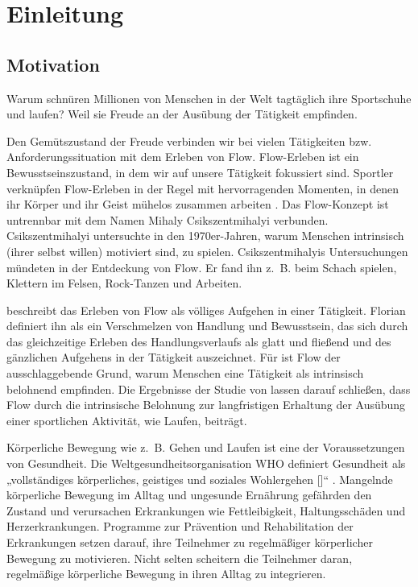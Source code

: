 \chapter{Einleitung} %
\label{cha:einleitung}

\section{Motivation} %
\label{sec:motivation}

Warum schnüren Millionen von Menschen in der Welt tagtäglich ihre Sportschuhe und laufen? Weil sie Freude an der Ausübung der Tätigkeit empfinden.

Den Gemütszustand der Freude verbinden wir bei vielen Tätigkeiten bzw. Anforderungssituation mit dem Erleben von Flow. Flow-Erleben ist ein Bewusstseinszustand, in dem wir auf unsere Tätigkeit fokussiert sind. Sportler verknüpfen Flow-Erleben in der Regel mit hervorragenden Momenten, in denen ihr Körper und ihr Geist mühelos zusammen arbeiten \citep[S.~5]{Jackson1999}. Das Flow-Konzept ist untrennbar mit dem Namen Mihaly Csikszentmihalyi verbunden. Csikszentmihalyi untersuchte in den 1970er-Jahren, warum Menschen intrinsisch (ihrer selbst willen) motiviert sind, zu spielen. Csikszentmihalyis Untersuchungen mündeten in der Entdeckung von Flow. Er fand ihn z.~B. beim Schach spielen, Klettern im Felsen, Rock-Tanzen und Arbeiten.

\citet[][S.~58~f.]{Csikszentmihalyi2010} beschreibt das Erleben von Flow als völliges Aufgehen in einer Tätigkeit. Florian \citet[][S.~13]{Henk2014} definiert ihn als ein Verschmelzen von Handlung und Bewusstsein, das sich durch das gleichzeitige Erleben des Handlungsverlaufs als glatt und fließend und des gänzlichen Aufgehens in der Tätigkeit auszeichnet. Für \citet[][S.~602]{Csikszentmihalyi2005} ist Flow der ausschlaggebende Grund, warum Menschen eine Tätigkeit als intrinsisch belohnend empfinden. Die Ergebnisse der Studie von \citet[][S.~174]{Schuler2009} lassen darauf schließen, dass Flow durch die intrinsische Belohnung zur langfristigen Erhaltung der Ausübung einer sportlichen Aktivität, wie Laufen, beiträgt.

Körperliche Bewegung wie z.~B. Gehen und Laufen ist eine der Voraussetzungen von Gesundheit. Die Weltgesundheitsorganisation \ac{WHO} definiert Gesundheit als „vollständiges körperliches, geistiges und soziales Wohlergehen [\textellipsis]“ \citep[S.~100]{WorldHealthOrganization1948}. Mangelnde körperliche Bewegung im Alltag und ungesunde Ernährung gefährden den Zustand und verursachen Erkrankungen wie Fettleibigkeit, Haltungsschäden und Herzerkrankungen. Programme zur Prävention und Rehabilitation der Erkrankungen setzen darauf, ihre Teilnehmer zu regelmäßiger körperlicher Bewegung zu motivieren. Nicht selten scheitern die Teilnehmer daran, regelmäßige körperliche Bewegung in ihren Alltag zu integrieren.

